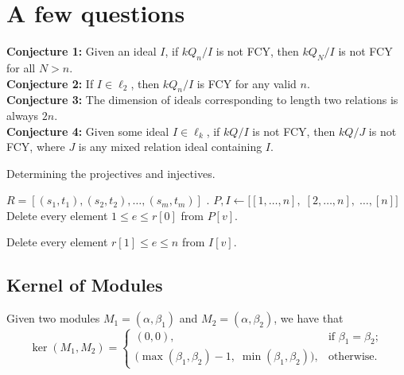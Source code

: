 \documentclass{article}
\begin{document}
\begin{flushleft}
\begin{center}
   \end{center}
   \section{A few questions}
   \textbf{Conjecture 1:} Given an ideal $I$, if $kQ_n/I$ is not FCY, then $kQ_N/I$ is not FCY for all $N > n$. \\
   \textbf{Conjecture 2:} If $I \in \ell_2$, then $kQ_n / I$ is FCY for any valid $n$. \\
   \textbf{Conjecture 3:} The dimension of ideals corresponding to length two relations is always $2n$. \\
   \textbf{Conjecture 4:} Given some ideal $I \in \ell_k$, if $kQ/I$ is not FCY, then $kQ/J$ is not FCY, 
   where $J$ is any mixed relation ideal containing $I$.
\end{flushleft}
\fi

\begin{algorithm}
   \begin{algorithmic}[1]
      \caption{Determining the projectives and injectives.}
      \Require $R = [(s_1, t_1), (s_2, t_2), \ldots, (s_m, t_m)]$ .
      \State $P, I \gets \big[[1, \ldots, n],\; [2, \ldots, n],\; \ldots, [n]\big]$ 
      \State Delete every element $1 \leq e \leq r[0]$ from $P[v]$. 
      \EndFor

      \State Delete every element $r[1] \leq e \leq n$ from $I[v]$. 
      \EndFor
      \EndFor
   \end{algorithmic}
\end{algorithm}

\subsection*{Kernel of Modules}
Given two modules $M_1 = (\alpha,\beta_1)$ and $M_2 = (\alpha,\beta_2)$, we have that 
\[
   \ker(M_1,M_2) = 
   \begin{cases}
      (0,0), & \text{if } \beta_1 = \beta_2; \\
      \big(\max(\beta_1,\beta_2) - 1, \; \min(\beta_1, \beta_2)\big), & \text{otherwise.}
   \end{cases}
\]
\end{document}
